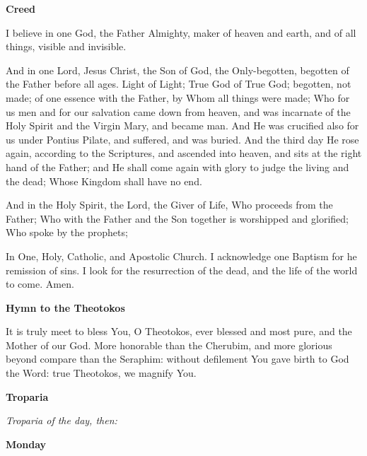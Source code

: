 \documentclass[paper=a6,fontsize=2.3mm]{scrartcl}
\begin{document}
\begin{center}
\textbf{Creed}
\end{center}

\noindent{}
\begin{minipage}[t]{\dimexpr \textwidth-10mm}
I believe in one God, the Father Almighty, maker of heaven and earth, and of all things, visible and invisible.

And in one Lord, Jesus Christ, the Son of God, the Only-begotten, begotten of the Father before all ages.  Light of Light; True God of True God; begotten, not made; of one essence with the Father, by Whom all things were made; Who for us men and for our salvation came down from heaven, and was incarnate of the Holy Spirit and the Virgin Mary, and became man.  And He was crucified also for us under Pontius Pilate, and suffered, and was buried.  And the third day He rose again, according to the Scriptures, and ascended into heaven, and sits at the right hand of the Father; and He shall come again with glory to judge the living and the dead; Whose Kingdom shall have no end.

And in the Holy Spirit, the Lord, the Giver of Life, Who proceeds from the Father; Who with the Father and the Son together is worshipped and glorified; Who spoke by the prophets;

In One, Holy, Catholic, and Apostolic Church.  I acknowledge one Baptism for he remission of sins.  I look for the resurrection of the dead, and the life of the world to come.  Amen.
\end{minipage}

\begin{center}
\textbf{Hymn to the Theotokos}
\end{center}

\noindent{}
\begin{minipage}[t]{\dimexpr \textwidth-10mm}
It is truly meet to bless You, O Theotokos, ever blessed and most pure, and the Mother of our God.  More honorable than the Cherubim, and more glorious beyond compare than the Seraphim: without defilement You gave birth to God the Word: true Theotokos, we magnify You.
\end{minipage}

\begin{center}
\textbf{Troparia}
\end{center}

\noindent
\textit{Troparia of the day, then:}
 
\begin{center}
\textbf{Monday}
\end{center}
\end{document}
